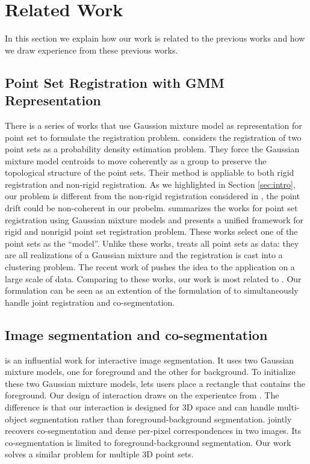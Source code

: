 \section{Related Work}
\label{sec:rw}
In this section we explain how our work is related to the previous works and how we draw experience from these previous works.
\subsection{Point Set Registration with GMM Representation}
\label{subsec:gmmreg}
There is a series of works that use Gaussion mixture model as representation for point set to formulate the registration problem.
\cite{CPD} considers the registration of two point sets as a probability density estimation problem. They force the Gaussian mixture model centroids to move coherently as a group to preserve the topological structure of the point sets. Their method is appliable to both rigid registration and non-rigid registration. As we highlighted in Section \ref{sec:intro}, our problem is different from the non-rigid registration considered in \cite{CPD}, the point drift could be non-coherent in our probelm.\cite{GMM_PAMI} summarizes the works for point set registration using Gaussian mixture models and presents a unified framework for rigid and nonrigid point set registration problem. These works select one of the point sets as the ``model''. Unlike these works, \cite{Evangelidis2014} treats all point sets as data: they are all realizations of a Gaussian mixture and the registration is cast into a clustering problem. The recent work of \cite{GOGMA} pushes the idea to the application on a large scale of data. 
Comparing to these works, our work is most related to \cite{Evangelidis2014}. Our formulation can be seen as an extention of the formulation of \cite{Evangelidis2014} to simultaneously handle joint registration and co-segmentation.
\subsection{Image segmentation and co-segmentation}
\label{subsec:coseg}
\cite{grabcut} is an influential work for interactive image segmentation. It uses two Gaussian mixture models, one for foreground and the other for background. To initialize these two Gaussian mixture models, \cite{grabcut} lets users place a rectangle that contains the foreground. Our design of interaction draws on the experientce from \cite{grabcut}. The difference is that our interaction is designed for 3D space and can handle multi-object segmentation rather than foreground-background segmentation. \cite{Taniai_2016_CVPR} jointly recovers co-segmentation and dense per-pixel correspondences in two images. Its co-segmentation is limited to foreground-background segmentation. Our work solves a similar problem for multiple 3D point sets. 

